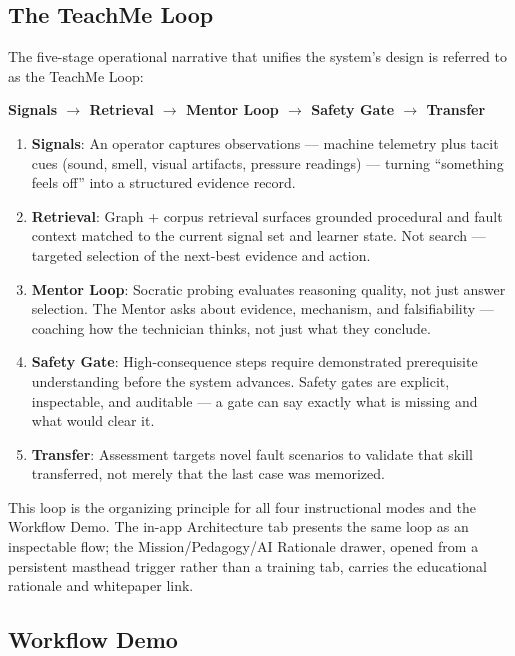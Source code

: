 \documentclass[11pt,letterpaper]{article}
\newcommand{\arrowto}{$\rightarrow$}
\begin{document}
\subsection{The TeachMe Loop}
\label{sec:teachme-loop}

The five-stage operational narrative that unifies the system's design is referred to as the TeachMe Loop:

\begin{center}
\large\bfseries\sffamily\color{tmaccent} Signals \arrowto{} Retrieval \arrowto{} Mentor Loop \arrowto{} Safety Gate \arrowto{} Transfer
\end{center}

\begin{enumerate}
  \item \textbf{Signals}: An operator captures observations --- machine telemetry plus tacit cues (sound, smell, visual artifacts, pressure readings) --- turning ``something feels off'' into a structured evidence record.
  \item \textbf{Retrieval}: Graph + corpus retrieval surfaces grounded procedural and fault context matched to the current signal set and learner state. Not search --- targeted selection of the next-best evidence and action.
  \item \textbf{Mentor Loop}: Socratic probing evaluates reasoning quality, not just answer selection. The Mentor asks about evidence, mechanism, and falsifiability --- coaching how the technician thinks, not just what they conclude.
  \item \textbf{Safety Gate}: High-consequence steps require demonstrated prerequisite understanding before the system advances. Safety gates are explicit, inspectable, and auditable --- a gate can say exactly what is missing and what would clear it.
  \item \textbf{Transfer}: Assessment targets novel fault scenarios to validate that skill transferred, not merely that the last case was memorized.
\end{enumerate}

This loop is the organizing principle for all four instructional modes and the Workflow Demo. The in-app Architecture tab presents the same loop as an inspectable flow; the Mission/Pedagogy/AI Rationale drawer, opened from a persistent masthead trigger rather than a training tab, carries the educational rationale and whitepaper link.

\subsection{Workflow Demo}
\label{sec:workflow-demo}
\end{document}
